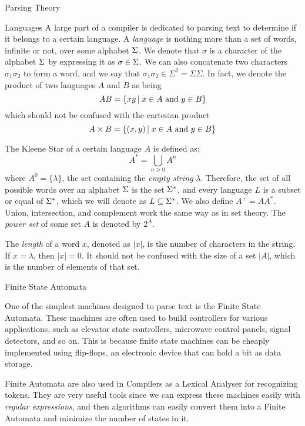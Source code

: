 \begin{section}{Parsing Theory}\label{sec:parsing}

\begin{subsection}{Languages}
A large part of a compiler is dedicated to parsing text to determine if
it belongs to a certain language. A \textit{language} is nothing more than
a set of words, infinite or not, over some alphabet $\Sigma$. We denote that
$\sigma$ is a character of the alphabet $\Sigma$ by expressing it as
$\sigma \in \Sigma$. We can also concatenate two characters $\sigma_1 \sigma_2$
to form a word, and we say that $\sigma_1 \sigma_2 \in \Sigma^2 = \Sigma\Sigma$.
In fact, we denote the product of two languages $A$ and $B$ as being
$$AB = \{xy\,|\;x \in A \text{ and } y \in B\}$$
which should not be confused with the cartesian product
$$A \times B = \{(x, y)\,|\;x \in A \text{ and } y \in B\}$$

The Kleene Star of a certain language $A$ is defined as:
$$A^* = \bigcup_{n \geq 0} A^n$$
where $A^0 = \{\lambda\}$, the set containing the \textit{empty string} $\lambda$.
Therefore, the set of all possible words over an alphabet $\Sigma$ is the set
$\Sigma^*$, and every language $L$ is a subset or equal of $\Sigma^*$, which we will
denote as $L \subseteq \Sigma^*$. We also define $A^+ = AA^*$. Union, intersection,
and complement work the same way as in set theory. The \textit{power set}
of some set $A$ is denoted by $2^A$.

The \textit{length} of a word $x$, denoted as $|x|$, is the number of characters
in the string. If $x = \lambda$, then $|x| = 0$. It should not be confused with
the size of a set $|A|$, which is the number of elements of that set.

\end{subsection}

\begin{subsection}{Finite State Automata}

One of the simplest machines designed to parse text is the Finite State
Automata. These machines are often used to build controllers for various
applications, such as elevator state controllers, microwave control panels,
signal detectors, and so on. This is because finite state machines can be
cheaply implemented using flip-flops, an electronic device that can hold a bit
as data storage.

Finite Automata are also used in Compilers as a Lexical Analyser for
recognizing tokens.  They are very useful tools since we can express these
machines easily with \textit{regular expressions}, and then algorithms can easily
convert them into a Finite Automata and minimize the number of states in it.


\end{subsection}
\end{section}
